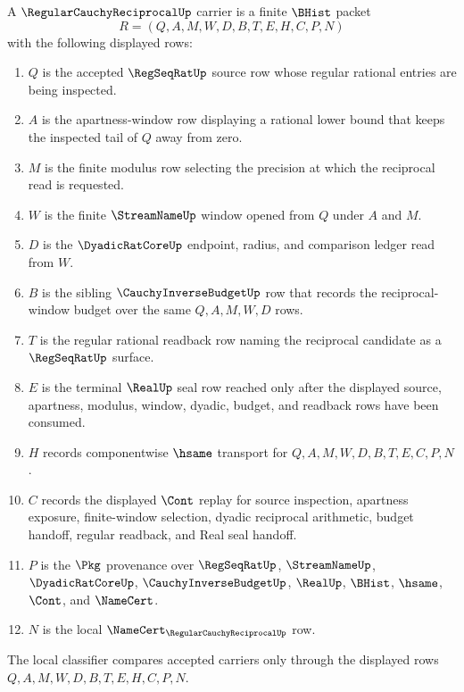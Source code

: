 \begin{definition}
\label{def:regular-cauchy-reciprocal-carrier}
A $\RegularCauchyReciprocalUp$ carrier is a finite $\BHist$ packet
$$
R=(Q,A,M,W,D,B,T,E,H,C,P,N)
$$
with the following displayed rows:
\begin{enumerate}
\item $Q$ is the accepted $\RegSeqRatUp$ source row whose regular rational entries are being inspected.
\item $A$ is the apartness-window row displaying a rational lower bound that keeps the inspected tail of $Q$ away from zero.
\item $M$ is the finite modulus row selecting the precision at which the reciprocal read is requested.
\item $W$ is the finite $\StreamNameUp$ window opened from $Q$ under $A$ and $M$.
\item $D$ is the $\DyadicRatCoreUp$ endpoint, radius, and comparison ledger read from $W$.
\item $B$ is the sibling $\CauchyInverseBudgetUp$ row that records the reciprocal-window budget over the same $Q,A,M,W,D$ rows.
\item $T$ is the regular rational readback row naming the reciprocal candidate as a $\RegSeqRatUp$ surface.
\item $E$ is the terminal $\RealUp$ seal row reached only after the displayed source, apartness, modulus, window, dyadic, budget, and readback rows have been consumed.
\item $H$ records componentwise $\hsame$ transport for $Q,A,M,W,D,B,T,E,C,P,N$.
\item $C$ records the displayed $\Cont$ replay for source inspection, apartness exposure, finite-window selection, dyadic reciprocal arithmetic, budget handoff, regular readback, and Real seal handoff.
\item $P$ is the $\Pkg$ provenance over $\RegSeqRatUp$, $\StreamNameUp$, $\DyadicRatCoreUp$, $\CauchyInverseBudgetUp$, $\RealUp$, $\BHist$, $\hsame$, $\Cont$, and $\NameCert$.
\item $N$ is the local $\NameCert_{\RegularCauchyReciprocalUp}$ row.
\end{enumerate}
The local classifier compares accepted carriers only through the displayed rows $Q,A,M,W,D,B,T,E,H,C,P,N$.
\end{definition}

